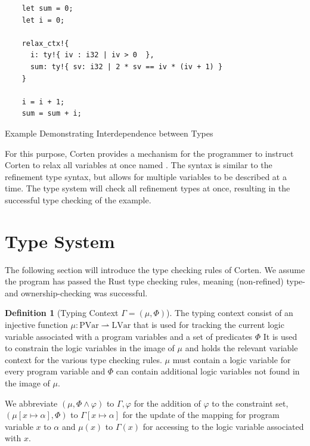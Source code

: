 \documentclass[twoside, english]{sdqthesis}
\theoremstyle{definition}
\newtheorem{definition}[theorem]{Definition}
\begin{document}
\begin{listing}[h]
  \begin{verbatim}
    let sum = 0;
    let i = 0;
    
    relax_ctx!{
      i: ty!{ iv : i32 | iv > 0  },
      sum: ty!{ sv: i32 | 2 * sv == iv * (iv + 1) }
    }

    i = i + 1;
    sum = sum + i;
  \end{verbatim}
  \caption{Example Demonstrating Interdependence between Types}
  \label{lst:mutual-reference}
\end{listing}

For this purpose, Corten provides a mechanism for the programmer to instruct Corten to relax all variables at once \- named . The syntax is similar to the refinement type syntax, but allows for multiple variables to be described at a time. The type system will check all refinement types at once, resulting in the successful type checking of the example.

\section{Type System} \label{sec:type-system}

The following section will introduce the type checking rules of Corten. We assume the program has passed the Rust type checking rules, meaning (non-refined) type- and ownership-checking was successful.

\begin{definition}[Typing Context $\Gamma = (\mu, \Phi)$]
  The typing context consist of an injective function $\mu : \text{PVar} \rightharpoonup \text{LVar}$ that is used for tracking the current logic variable associated with a program variables and a set of predicates $\Phi$
  It is used to constrain the logic variables in the image of $\mu$ and holds the relevant variable context for the various type checking rules.
  $\mu$ must contain a logic variable for every program variable and $\Phi$ can contain additional logic variables not found in the image of $\mu$.

  We abbreviate $(\mu, \Phi \wedge \varphi)$ to $\Gamma, \varphi$ for the addition of $\varphi$ to the constraint set, $(\mu[x \mapsto \alpha], \Phi)$ to $\Gamma[x \mapsto \alpha]$ for the update of the mapping for program variable $x$ to $\alpha$ and 
  $\mu(x)$ to $\Gamma(x)$ for accessing to the logic variable associated with $x$.
\end{definition}
\end{document}
